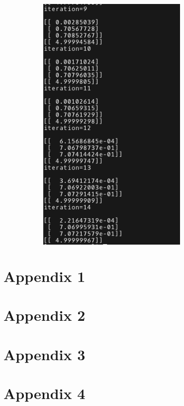 \documentclass{article}
\begin{document}
\begin{figure}[H]
\begin{subfigure}[b]{0.49\textwidth}
        \includegraphics[width=0.8\textwidth]{p4b2.png}
    \end{subfigure}
\end{figure}


\clearpage
\appendix
\section{Appendix 1}



\section{Appendix 2}




\section{Appendix 3}


\section{Appendix 4}


\end{document}

